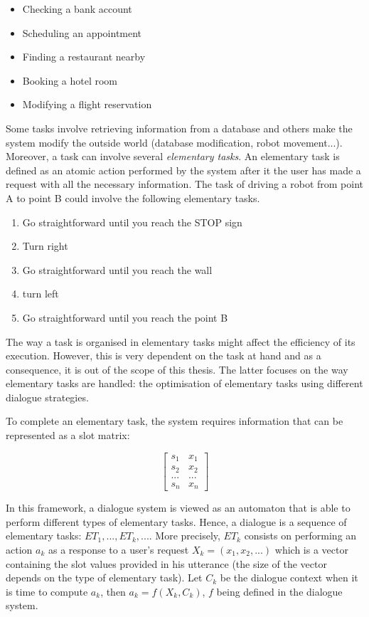 	\begin{itemize}
		\item Checking a bank account
		\item Scheduling an appointment
		\item Finding a restaurant nearby
		\item Booking a hotel room
		\item Modifying a flight reservation
	\end{itemize}
	
	Some tasks involve retrieving information from a database and others make the system modify the outside world (database modification, robot movement...). Moreover, a task can involve several \textit{elementary tasks}. An elementary task is defined as an atomic action performed by the system after it the user has made a request with all the necessary information. The task of driving a robot from point A to point B could involve the following elementary tasks.
	
	\begin{enumerate}
		\item Go straightforward until you reach the STOP sign
		\item Turn right
		\item Go straightforward until you reach the wall
		\item turn left
		\item Go straightforward until you reach the point B
	\end{enumerate}
	
	The way a task is organised in elementary tasks might affect the efficiency of its execution. However, this is very dependent on the task at hand and as a consequence, it is out of the scope of this thesis. The latter focuses on the way elementary tasks are handled: the optimisation of elementary tasks using different dialogue strategies.
	
	To complete an elementary task, the system requires information that can be represented as a slot matrix:
	
		$$
		\begin{bmatrix}
			s_1 & x_1 \\
			s_2 & x_2 \\
			... & ... \\
			s_n & x_n
		\end{bmatrix}
		$$
	
	In this framework, a dialogue system is viewed as an automaton that is able to perform different types of elementary tasks. Hence, a dialogue is a sequence of elementary tasks: $ET_1,...,ET_k,...$. More precisely, $ET_k$ consists on performing an action $a_k$ as a response to a user's request $X_k = (x_1, x_2, ...)$ which is a vector containing the slot values provided in his utterance (the size of the vector depends on the type of elementary task). Let $C_k$ be the dialogue context when it is time to compute $a_k$, then $a_k = f(X_k,C_k)$, $f$ being defined in the dialogue system.
	
